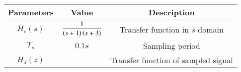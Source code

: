 \begin{tabular}{|c|c|c|}
\hline
\textbf{Parameters} & \textbf{Value} & \textbf{Description}\\
\hline
$ H_c(s) $ & $\dfrac{1}{\left(s+1\right)\left(s+3\right)}$ & Transfer function in $s$ domain\\
\hline
$T_s$ & $0.1s$ & Sampling period \\
\hline
$H_d(z)$ & & Transfer function of sampled signal\\
\hline
\end{tabular}
